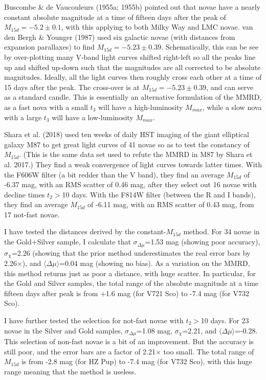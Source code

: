 \documentclass[a4paper,fleqn,usenatbib]{mnras}
\begin{document}
Buscombe \& de Vaucouleurs (1955a; 1955b) pointed out that novae have a nearly constant absolute magnitude at a time of fifteen days after the peak of $M_{15d}=-5.2\pm0.1$, with this applying to both Milky Way and LMC novae.  van den Bergh \& Younger (1987) used six galactic novae (with distances from expansion parallaxes) to find $M_{15d}=-5.23\pm0.39$.  Schematically, this can be see by over-plotting many V-band light curves shifted right-left so all the peaks line up and shifted up-down such that the magnitudes are all corrected to be absolute magnitudes.  Ideally, all the light curves then roughly cross each other at a time of 15 days after the peak.  The cross-over is at $M_{15d}=-5.23\pm0.39$, and can serve as a standard candle.  This is essentially an alternative formulation of the MMRD, as a fast nova with a small $t_3$ will have a high-luminosity $M_{max}$, while a slow nova with a large $t_3$ will have a low-luminosity $M_{max}$.

Shara et al. (2018) used ten weeks of daily HST imaging of the giant elliptical galaxy M87 to get great light curves of 41 novae so as to test the constancy of $M_{15d}$.  (This is the same data set used to refute the MMRD in M87 by Shara et al. 2017.)  They find a weak convergence of light curves towards latter times.  With the F606W filter (a bit redder than the V band), they find an average $M_{15d}$ of -6.37 mag, with an RMS scatter of 0.46 mag, after they select out 16 novae with decline times $t_2>$10 days.  With the F814W filter (between the R and I bands), they find an average $M_{15d}$ of -6.11 mag, with an RMS scatter of 0.43 mag, from 17 not-fast novae.

I have tested the distances derived by the constant-$M_{15d}$ method.  For 34 novae in the Gold+Silver sample, I calculate that $\sigma_{\Delta \mu}$=1.53 mag (showing poor accuracy), $\sigma_{\chi}$=2.26 (showing that the prior method underestimates the real error bars by 2.26$\times$), and $\langle \Delta \mu \rangle$=0.04 mag (showing no bias).  As a variation on the MMRD, this method returns just as poor a distance, with huge scatter.  In particular, for the Gold and Silver samples, the total range of the absolute magnitude at a time fifteen days after peak is from +1.6 mag (for V721 Sco) to -7.4 mag (for V732 Sco).

I have further tested the selection for not-fast novae with $t_2>$10 days.  For 23 novae in the Silver and Gold samples, $\sigma_{\Delta \mu}$=1.08 mag, $\sigma_{\chi}$=2.21, and $\langle \Delta \mu \rangle$=-0.28.  This selection of non-fast novae is a bit of an improvement.  But the accuracy is still poor, and the error bars are a factor of 2.21$\times$ too small.  The total range of $M_{15d}$ is from -2.8 mag (for HZ Pup) to -7.4 mag (for V732 Sco), with this huge range meaning that the method is useless.
\end{document}
